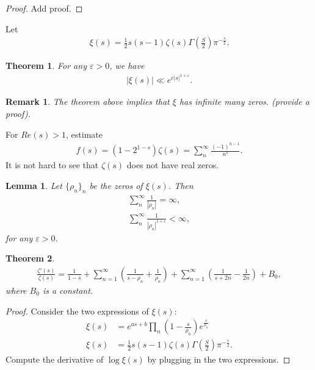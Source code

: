 \documentclass[a4paper,10pt]{amsart}
\newtheorem{theorem}{Theorem}[section]
\newtheorem{lemma}{Lemma}[section]
\newtheorem{remark}{Remark}[section]
\begin{document}
\begin{proof}
   Add proof. 
\end{proof}

Let 
\begin{align*}
    \xi(s) = \frac{1}{2}
    s(s-1)\zeta(s)\Gamma(\frac{S}{2})\pi^{-\frac{s}{2}}.  
\end{align*}

\begin{theorem}
For any $\varepsilon > 0$, we have
\begin{align*}
    |\xi(s)|  \ll e^{c|s|^{1+\varepsilon}}. 
\end{align*}
\end{theorem}

\begin{remark}
   The theorem above implies that $\xi$ has infinite many zeros. 
   (provide a proof).
\end{remark}

For $Re(s) > 1$, estimate  
\begin{align*}
    f(s) = (1-2^{1-s})\zeta(s) = \sum_{n}^{\infty}\frac{(-1)^{n-1}}{n^{s}}. 
\end{align*}
It is not hard to see that $\zeta(s)$ does not have real zeros.

\begin{lemma}
    Let $\{\rho_n\}_{n}$ be the zeros of $\xi(s)$. Then
    \begin{align*}
        \sum^{\infty}_{n} \frac{1}{|\rho_n|} = \infty, \\ 
        \sum^{\infty}_{n} \frac{1}{|\rho_n|^{1+\varepsilon}} < \infty, 
    \end{align*}
    for any $\varepsilon > 0$.
\end{lemma}

\begin{theorem}
   \begin{align*}
       \frac{\zeta'(s)}{\zeta(s)} = \frac{1}{1-s} + 
       \sum^{\infty}_{n=1}(\frac{1}{s-\rho_n} + \frac{1}{\rho_n})
       + \sum^{\infty}_{n=1}(\frac{1}{s+2n} - \frac{1}{2n}) + B_{0},
   \end{align*} 
   where $B_0$ is a constant.
\end{theorem}

\begin{proof}
    Consider the two expressions of $\xi(s)$:
    \begin{align*}
        \xi(s) &= 
        e^{as+b}\prod_{n}(1-\frac{s}{\rho_n})e^{\frac{s}{\rho_n}}\\
        \xi(s) &= \frac{1}{2}
    s(s-1)\zeta(s)\Gamma(\frac{S}{2})\pi^{-\frac{s}{2}}.  
    \end{align*}
    Compute the derivative of $\log \xi(s)$ 
    by plugging in the two expressions.
\end{proof}
\end{document}
